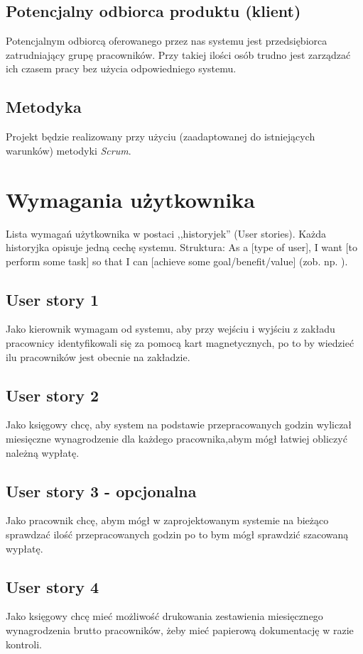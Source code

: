 \documentclass[a4paper]{article}
\begin{document}
\subsection{Potencjalny odbiorca produktu (klient)}

Potencjalnym odbiorcą oferowanego przez nas systemu jest przedsiębiorca zatrudniający grupę pracowników. Przy takiej ilości osób trudno jest zarządzać ich czasem pracy bez użycia odpowiedniego systemu.  

\subsection{Metodyka}

Projekt będzie realizowany przy użyciu (zaadaptowanej do istniejących warunków) metodyki {\em Scrum}. 

\section{Wymagania użytkownika}
Lista wymagań użytkownika w postaci ,,historyjek'' (User stories). Każda historyjka opisuje jedną cechę systemu. Struktura: As a [type of user], I want [to perform some task] so that I can [achieve some goal/benefit/value] (zob. np. \cite{us}).

\subsection{User story 1}
Jako kierownik wymagam od systemu, aby przy wejściu i wyjściu z zakładu pracownicy identyfikowali się za pomocą kart magnetycznych, po to by wiedzieć ilu pracowników jest obecnie na zakładzie.

\subsection{User story 2}
Jako księgowy chcę, aby system na podstawie przepracowanych godzin wyliczał miesięczne wynagrodzenie dla każdego pracownika,abym mógł łatwiej obliczyć należną wypłatę.

\subsection{User story 3 - opcjonalna}
Jako pracownik chcę, abym mógł w zaprojektowanym systemie na bieżąco sprawdzać ilość przepracowanych godzin po to bym mógł sprawdzić szacowaną wypłatę.

\subsection{User story 4}
Jako księgowy chcę mieć możliwość drukowania zestawienia miesięcznego wynagrodzenia brutto pracowników, żeby mieć papierową dokumentację w razie kontroli.
\end{document}
